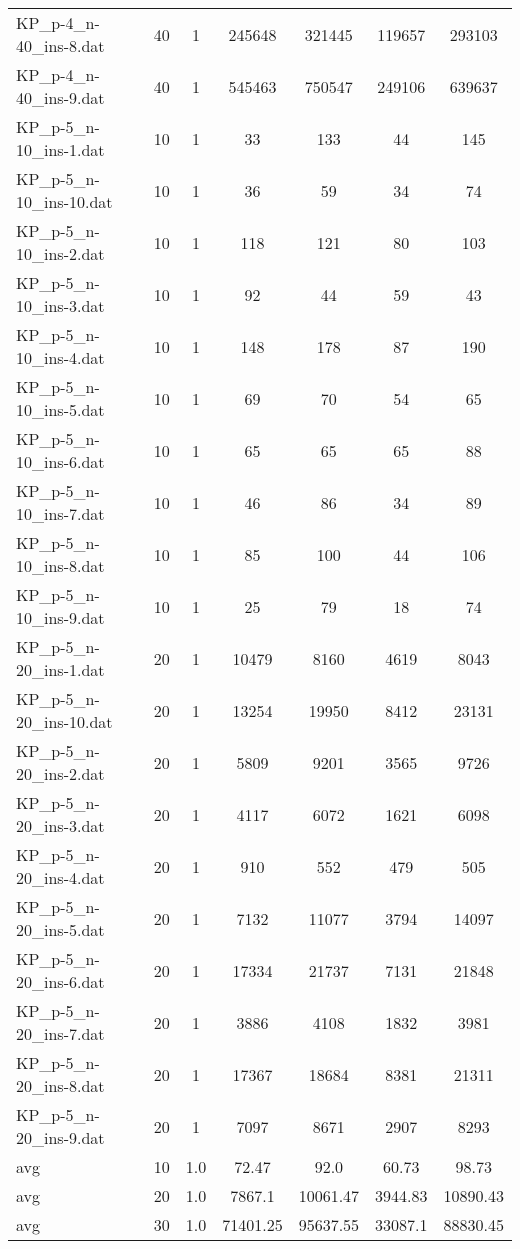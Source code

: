\begin{table}[!ht]
\begin{tabular}{lcccccc}
KP\_p-4\_n-40\_ins-8.dat & 40 & 1 & 245648 & 321445 & 119657 & 293103 \\
KP\_p-4\_n-40\_ins-9.dat & 40 & 1 & 545463 & 750547 & 249106 & 639637 \\
KP\_p-5\_n-10\_ins-1.dat & 10 & 1 & 33 & 133 & 44 & 145 \\
KP\_p-5\_n-10\_ins-10.dat & 10 & 1 & 36 & 59 & 34 & 74 \\
KP\_p-5\_n-10\_ins-2.dat & 10 & 1 & 118 & 121 & 80 & 103 \\
KP\_p-5\_n-10\_ins-3.dat & 10 & 1 & 92 & 44 & 59 & 43 \\
KP\_p-5\_n-10\_ins-4.dat & 10 & 1 & 148 & 178 & 87 & 190 \\
KP\_p-5\_n-10\_ins-5.dat & 10 & 1 & 69 & 70 & 54 & 65 \\
KP\_p-5\_n-10\_ins-6.dat & 10 & 1 & 65 & 65 & 65 & 88 \\
KP\_p-5\_n-10\_ins-7.dat & 10 & 1 & 46 & 86 & 34 & 89 \\
KP\_p-5\_n-10\_ins-8.dat & 10 & 1 & 85 & 100 & 44 & 106 \\
KP\_p-5\_n-10\_ins-9.dat & 10 & 1 & 25 & 79 & 18 & 74 \\
KP\_p-5\_n-20\_ins-1.dat & 20 & 1 & 10479 & 8160 & 4619 & 8043 \\
KP\_p-5\_n-20\_ins-10.dat & 20 & 1 & 13254 & 19950 & 8412 & 23131 \\
KP\_p-5\_n-20\_ins-2.dat & 20 & 1 & 5809 & 9201 & 3565 & 9726 \\
KP\_p-5\_n-20\_ins-3.dat & 20 & 1 & 4117 & 6072 & 1621 & 6098 \\
KP\_p-5\_n-20\_ins-4.dat & 20 & 1 & 910 & 552 & 479 & 505 \\
KP\_p-5\_n-20\_ins-5.dat & 20 & 1 & 7132 & 11077 & 3794 & 14097 \\
KP\_p-5\_n-20\_ins-6.dat & 20 & 1 & 17334 & 21737 & 7131 & 21848 \\
KP\_p-5\_n-20\_ins-7.dat & 20 & 1 & 3886 & 4108 & 1832 & 3981 \\
KP\_p-5\_n-20\_ins-8.dat & 20 & 1 & 17367 & 18684 & 8381 & 21311 \\
KP\_p-5\_n-20\_ins-9.dat & 20 & 1 & 7097 & 8671 & 2907 & 8293 \\
\hline avg & 10 & 1.0 &  72.47 & 92.0 &  60.73 & 98.73 \\ \hline
\hline avg & 20 & 1.0 &  7867.1 & 10061.47 &  3944.83 & 10890.43 \\ \hline
\hline avg & 30 & 1.0 &  71401.25 & 95637.55 &  33087.1 & 88830.45 \\ \hline

\end{tabular}
\end{table}
